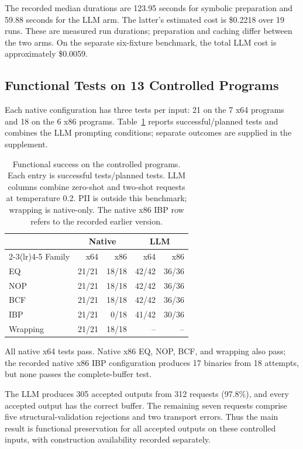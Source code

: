 The recorded median durations are 123.95 seconds for symbolic preparation
and 59.88 seconds for the LLM arm. The latter's estimated cost is \$0.2218
over 19 runs. These are measured run durations; preparation and caching differ
between the two arms. On the separate six-fixture benchmark,
the total LLM cost is approximately \$0.0059. 

\subsection{Functional Tests on 13 Controlled Programs}
Each native configuration has three tests per input: 21 on the 7 x64
programs and 18 on the 6 x86 programs. Table~\ref{tab:controlled_functional}
reports successful/planned tests and combines the LLM prompting conditions;
separate outcomes are supplied in the supplement.

\begin{table}[t]
\caption{Functional success on the controlled programs. Each entry is
successful tests/planned tests. LLM columns combine zero-shot and two-shot
requests at temperature 0.2. PII is outside this benchmark; wrapping is
native-only. The native x86 IBP row refers to the recorded earlier version.}
\label{tab:controlled_functional}
\centering\small\setlength{\tabcolsep}{7pt}
\begin{tabular}{@{}lrrrr@{}}
\toprule
 & \multicolumn{2}{c}{Native} & \multicolumn{2}{c}{LLM} \\
\cmidrule(lr){2-3}\cmidrule(lr){4-5}
Family & x64 & x86 & x64 & x86 \\
\midrule
EQ & 21/21 & 18/18 & 42/42 & 36/36 \\
NOP & 21/21 & 18/18 & 42/42 & 36/36 \\
BCF & 21/21 & 18/18 & 42/42 & 36/36 \\
IBP & 21/21 & 0/18 & 41/42 & 30/36 \\
Wrapping & 21/21 & 18/18 & -- & -- \\
\bottomrule
\end{tabular}
\end{table}

All native x64 tests pass. Native x86 EQ, NOP, BCF, and wrapping also
pass; the recorded native x86 IBP configuration produces 17 binaries from
18 attempts, but none passes the complete-buffer test.

The LLM produces 305 accepted outputs from 312 requests (97.8\%), and
every accepted output has the correct buffer. The remaining seven requests
comprise five structural-validation rejections and two transport errors.
Thus the main result is functional preservation for all accepted outputs
on these controlled inputs, with construction availability recorded separately.

